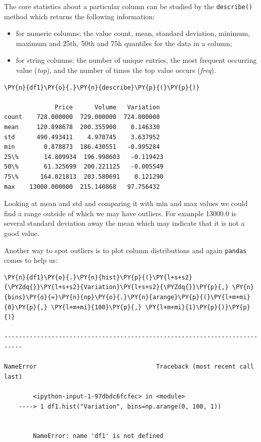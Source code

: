 The core statistics about a particular column can be studied by the \texttt{describe()} method which returns the following information:
\begin{itemize}
\item for numeric columns: the value count, mean, standard deviation, minimum, maximum and 25th, 50th and 75h quantiles for the data in a column;
\item for string columns: the number of unique entries, the most frequent occurring value (\emph{top}), and the number of times the top value occurs (\emph{freq}).
\end{itemize}

\begin{tcolorbox}[breakable, size=fbox, boxrule=1pt, pad at break*=1mm,colback=cellbackground, colframe=cellborder]
\begin{Verbatim}[commandchars=\\\{\}]
\PY{n}{df1}\PY{o}{.}\PY{n}{describe}\PY{p}{(}\PY{p}{)}

              Price      Volume   Variation
count    728.000000  729.000000  724.000000
mean     120.898678  200.355900    0.146330
std      490.493411    4.970745    3.637952
min        0.878873  186.430551   -0.995284
25\%       14.809934  196.998603   -0.119423
50\%       61.325699  200.221125   -0.005549
75\%      164.021813  203.580691    0.121290
max    13000.000000  215.140868   97.756432
\end{Verbatim}
\end{tcolorbox}
        
Looking at mean and std and comparing it with min and max values we could find a range outside of which we may have outliers. For example 13000.0 is several standard deviation away the mean which may indicate that it is not a good value.

Another way to spot outliers is to plot column distributions and again \texttt{pandas} comes to help us:

\begin{tcolorbox}[breakable, size=fbox, boxrule=1pt, pad at break*=1mm,colback=cellbackground, colframe=cellborder]
\begin{Verbatim}[commandchars=\\\{\}]
\PY{n}{df1}\PY{o}{.}\PY{n}{hist}\PY{p}{(}\PY{l+s+s2}{\PYZdq{}}\PY{l+s+s2}{Variation}\PY{l+s+s2}{\PYZdq{}}\PY{p}{,} \PY{n}{bins}\PY{o}{=}\PY{n}{np}\PY{o}{.}\PY{n}{arange}\PY{p}{(}\PY{l+m+mi}{0}\PY{p}{,} \PY{l+m+mi}{100}\PY{p}{,} \PY{l+m+mi}{1}\PY{p}{)}\PY{p}{)}

---------------------------------------------------------------------------

NameError                                 Traceback (most recent call last)

        <ipython-input-1-97dbdc6fcfec> in <module>
    ----> 1 df1.hist("Variation", bins=np.arange(0, 100, 1))
    

        NameError: name 'df1' is not defined
\end{Verbatim}
\end{tcolorbox}

